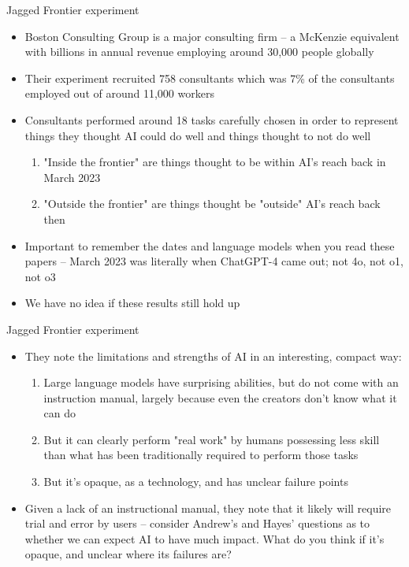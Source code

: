 \documentclass{beamer}
\begin{document}
\begin{frame}{Jagged Frontier experiment}

\begin{itemize}
\item Boston Consulting Group is a major consulting firm -- a McKenzie equivalent with billions in annual revenue employing around 30,000 people globally
\item Their experiment recruited 758 consultants which was 7\% of the consultants employed out of around 11,000 workers
\item Consultants performed around 18 tasks carefully chosen in order to represent things they thought AI could do well and things thought to not do well
	\begin{enumerate}
	\item "Inside the frontier" are things thought to be within AI's reach  back in March 2023
	\item "Outside the frontier" are things thought be "outside" AI's reach back then
	\end{enumerate}
\item Important to remember the dates and language models when you read these papers -- March 2023 was literally when ChatGPT-4 came out; not 4o, not o1, not o3
\item We have no idea if these results still hold up
\end{itemize}

\end{frame}

\begin{frame}{Jagged Frontier experiment}

\begin{itemize}
\item They note the limitations and strengths of AI in an interesting, compact way:
	\begin{enumerate}
	\item Large language models have surprising abilities, but do not come with an instruction manual, largely because even the creators don't know what it can do
	\item But it can clearly perform "real work" by humans possessing less skill than what has been traditionally required to perform those tasks
	\item But it's opaque, as a technology, and has unclear failure points
	\end{enumerate}
\item Given a lack of an instructional manual, they note that it likely will require trial and error by users -- consider Andrew's and Hayes' questions as to whether we can expect AI to have much impact. What do you think if it's opaque, and unclear where its failures are?
\end{itemize}

\end{frame}
\end{document}
